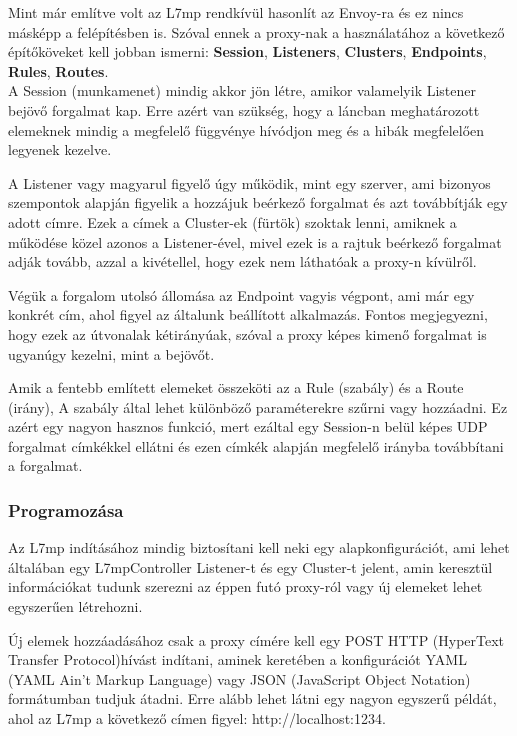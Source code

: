 Mint már említve volt az L7mp rendkívül hasonlít az Envoy-ra és ez nincs másképp 
a felépítésben is. Szóval ennek a proxy-nak a használatához a következő 
építőköveket kell jobban ismerni: \textbf{Session}, \textbf{Listeners}, \textbf{Clusters}, \textbf{Endpoints}, \textbf{Rules}, \textbf{Routes}.\\

A Session (munkamenet) mindig akkor jön létre, amikor valamelyik Listener 
bejövő forgalmat kap. Erre azért van szükség, hogy a láncban meghatározott 
elemeknek mindig a megfelelő függvénye hívódjon meg és a hibák megfelelően 
legyenek kezelve. 

A Listener vagy magyarul figyelő úgy működik, mint egy szerver, ami bizonyos 
szempontok alapján figyelik a hozzájuk beérkező forgalmat és azt továbbítják
egy adott címre. Ezek a címek a Cluster-ek (fürtök) szoktak lenni, amiknek a 
működése közel azonos a Listener-ével, mivel ezek is a rajtuk beérkező forgalmat
adják tovább, azzal a kivétellel, hogy ezek nem láthatóak a proxy-n kívülről.

Végük a forgalom utolsó állomása az Endpoint vagyis végpont, ami már egy konkrét
cím, ahol figyel az általunk beállított alkalmazás. Fontos megjegyezni, hogy 
ezek az útvonalak kétirányúak, szóval a proxy képes kimenő forgalmat is ugyanúgy 
kezelni, mint a bejövőt. 

Amik a fentebb említett elemeket összeköti az a Rule (szabály) és a Route (irány),
A szabály által lehet különböző paraméterekre szűrni vagy hozzáadni. Ez azért egy 
nagyon hasznos funkció, mert ezáltal egy Session-n belül képes UDP forgalmat 
címkékkel ellátni és ezen címkék alapján megfelelő irányba továbbítani a 
forgalmat.

\subsubsection{Programozása}

Az L7mp indításához mindig biztosítani kell neki egy alapkonfigurációt, ami 
lehet általában egy L7mpController Listener-t és egy Cluster-t jelent, amin 
keresztül információkat tudunk szerezni az éppen futó proxy-ról vagy új 
elemeket lehet egyszerűen létrehozni. 

Új elemek hozzáadásához csak a proxy címére kell egy POST HTTP (HyperText Transfer 
Protocol)hívást indítani, aminek keretében a konfigurációt YAML (YAML Ain't Markup 
Language) vagy JSON (JavaScript Object Notation) formátumban tudjuk átadni.
Erre alább lehet látni egy nagyon egyszerű példát, ahol az L7mp a következő címen 
figyel: http://localhost:1234. 

